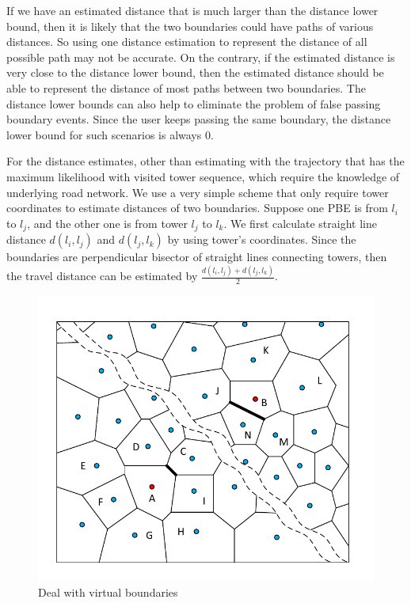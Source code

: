 If we have an estimated distance that is much larger than the distance lower bound, then it is likely that the two boundaries could have paths of various distances. So using one distance estimation to represent the distance of all possible path may not be accurate. On the contrary, if the estimated distance is very close to the distance lower bound, then the estimated distance should be able to represent the distance of most paths between two boundaries. The distance lower bounds can also help to eliminate the problem of false passing boundary events. Since the user keeps passing the same boundary, the distance lower bound for such scenarios is always $0$. 

For the distance estimates, other than estimating with the trajectory that has the maximum likelihood with visited tower sequence, which require the knowledge of underlying road network. We use a very simple scheme that only require tower coordinates to estimate distances of two boundaries. Suppose one PBE is from $l_i$ to $l_j$, and the other one is from tower $l_j$ to $l_k$. We first calculate straight line distance $d(l_i,l_j)$ and $d(l_j,l_k)$ by using tower's coordinates. Since the boundaries are perpendicular bisector of straight lines connecting towers, then the travel distance can be estimated by $\frac{d(l_i,l_j) + d(l_j,l_k)}{2}$. 

\begin{figure}[h]
    \centering
    \includegraphics[width=\linewidth]{./figures/virtual_boundary.pdf}
    \caption{Deal with virtual boundaries}
		\label{fig:virtual}
\end{figure}

